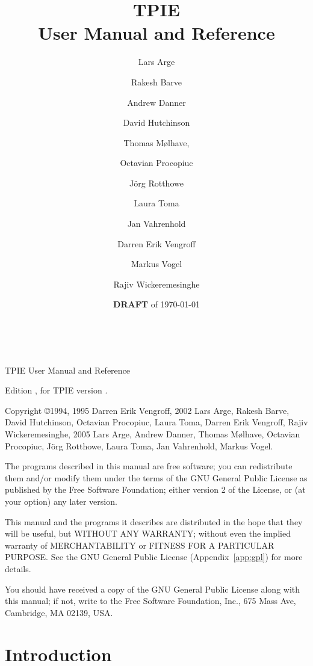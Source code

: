 \documentclass[10pt]{book}
\begin{document}
\title{{\Huge TPIE}\\ User Manual and Reference}
\author{%
Lars Arge \and 
Rakesh Barve \and
Andrew Danner \and
David Hutchinson \and 
Thomas M\o lhave, \and
Octavian Procopiuc \and 
J\"{o}rg Rotthowe \and
Laura Toma \and
Jan Vahrenhold \and
Darren Erik Vengroff \and 
Markus Vogel \and
Rajiv Wickeremesinghe}


\date{{\bf DRAFT} of \today}

\maketitle

\begin{titlepage}
\mbox{ }

\vspace{\fill}

\noindent TPIE User Manual and Reference

\noindent Edition \edition, for TPIE version \version.

\vspace{2ex}

\noindent Copyright \copyright 1994, 1995 Darren Erik Vengroff, 2002 Lars
Arge, Rakesh Barve, David Hutchinson, Octavian Procopiuc, Laura Toma,
Darren Erik Vengroff, Rajiv Wickeremesinghe, 2005 Lars Arge, Andrew
Danner, Thomas M\o lhave, Octavian Procopiuc, J\"{o}rg Rotthowe,
Laura Toma, Jan Vahrenhold, Markus Vogel.


\vspace{2ex}

The programs described in this manual are free software; you can
redistribute them and/or modify them under the terms of the GNU General
Public License as published by the Free Software Foundation; either
version 2 of the License, or (at your option) any later version.

This manual and the programs it describes are distributed in the hope
that they will be useful, but WITHOUT ANY WARRANTY; without even the
implied warranty of MERCHANTABILITY or FITNESS FOR A PARTICULAR
PURPOSE.  See the GNU General Public License (Appendix~\ref{app:gpl})
for more details.

You should have received a copy of the GNU General Public License
along with this manual; if not, write to the Free Software Foundation,
Inc., 675 Mass Ave, Cambridge, MA 02139, USA.
\end{titlepage}

\tableofcontents

\chapter*{Introduction}
\end{document}
